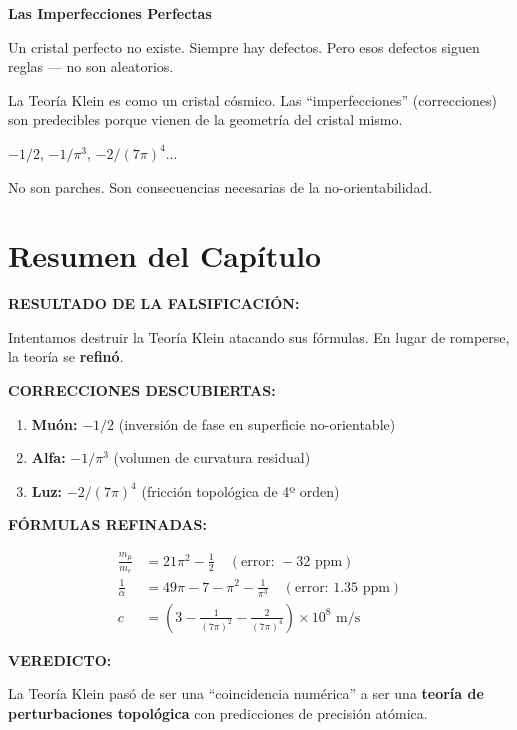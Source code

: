 \begin{analogiabox}
\textbf{Las Imperfecciones Perfectas}

Un cristal perfecto no existe. Siempre hay defectos.
Pero esos defectos siguen reglas --- no son aleatorios.

La Teoría Klein es como un cristal cósmico.
Las ``imperfecciones'' (correcciones) son predecibles
porque vienen de la geometría del cristal mismo.

$-1/2$, $-1/\pi^3$, $-2/(7\pi)^4$...

No son parches. Son consecuencias necesarias de la no-orientabilidad.
\end{analogiabox}


\section{Resumen del Capítulo}

\begin{tcolorbox}[colback=kleingray, colframe=kleinblue, title=\textbf{Resumen del Capítulo 11}]

\textbf{RESULTADO DE LA FALSIFICACIÓN:}

Intentamos destruir la Teoría Klein atacando sus fórmulas.
En lugar de romperse, la teoría se \textbf{refinó}.

\vspace{0.3cm}
\textbf{CORRECCIONES DESCUBIERTAS:}

\begin{enumerate}
    \item \textbf{Muón:} $-1/2$ (inversión de fase en superficie no-orientable)
    \item \textbf{Alfa:} $-1/\pi^3$ (volumen de curvatura residual)
    \item \textbf{Luz:} $-2/(7\pi)^4$ (fricción topológica de 4º orden)
\end{enumerate}

\vspace{0.3cm}
\textbf{FÓRMULAS REFINADAS:}

\begin{align}
\frac{m_\mu}{m_e} &= 21\pi^2 - \frac{1}{2} \quad (\text{error: } -32 \text{ ppm})\\[0.3cm]
\frac{1}{\alpha} &= 49\pi - 7 - \pi^2 - \frac{1}{\pi^3} \quad (\text{error: } 1.35 \text{ ppm})\\[0.3cm]
c &= \left(3 - \frac{1}{(7\pi)^2} - \frac{2}{(7\pi)^4}\right) \times 10^8 \text{ m/s}
\end{align}

\vspace{0.3cm}
\textbf{VEREDICTO:}

La Teoría Klein pasó de ser una ``coincidencia numérica''
a ser una \textbf{teoría de perturbaciones topológica}
con predicciones de precisión atómica.

\end{tcolorbox}


